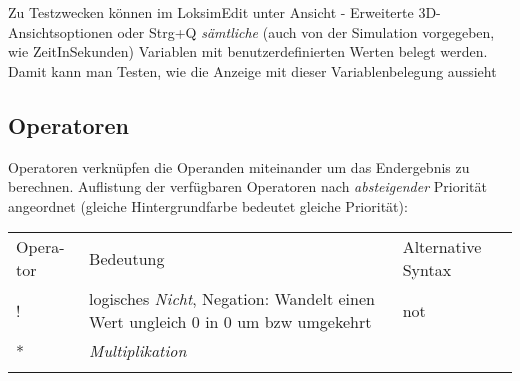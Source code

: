Zu Testzwecken können im LoksimEdit unter Ansicht - Erweiterte
3D-Ansichtsoptionen oder Strg+Q \emph{sämtliche} (auch von der Simulation
vorgegeben, wie ZeitInSekunden) Variablen mit benutzerdefinierten Werten
belegt werden. Damit kann man Testen, wie die Anzeige mit dieser
Variablenbelegung aussieht

\subsection{Operatoren}

Operatoren verknüpfen die Operanden miteinander um das Endergebnis zu
berechnen. Auflistung der verfügbaren Operatoren nach
\emph{absteigender} Priorität angeordnet (gleiche Hintergrundfarbe
bedeutet gleiche Priorität):

\begin{longtable}[c]{@{}lll@{}}
\hline\noalign{\medskip}
\begin{minipage}[b]{0.08\columnwidth}\raggedright
Opera-tor
\end{minipage} & \begin{minipage}[b]{0.77\columnwidth}\raggedright
Bedeutung
\end{minipage} & \begin{minipage}[b]{0.15\columnwidth}\raggedright
Alternative Syntax
\end{minipage}
\\\noalign{\medskip}
\hline\noalign{\medskip}
\begin{minipage}[t]{0.08\columnwidth}\raggedright
!
\end{minipage} & \begin{minipage}[t]{0.77\columnwidth}\raggedright
logisches \emph{Nicht}, Negation: Wandelt einen Wert ungleich 0 in 0 um
bzw umgekehrt
\end{minipage} & \begin{minipage}[t]{0.15\columnwidth}\raggedright
not
\end{minipage}
\\\noalign{\medskip}
\begin{minipage}[t]{0.08\columnwidth}\raggedright
*
\end{minipage} & \begin{minipage}[t]{0.77\columnwidth}\raggedright
\emph{Multiplikation}
\end{minipage} & \begin{minipage}[t]{0.15\columnwidth}\raggedright
\end{minipage}
\\\noalign{\medskip}

\end{longtable}
